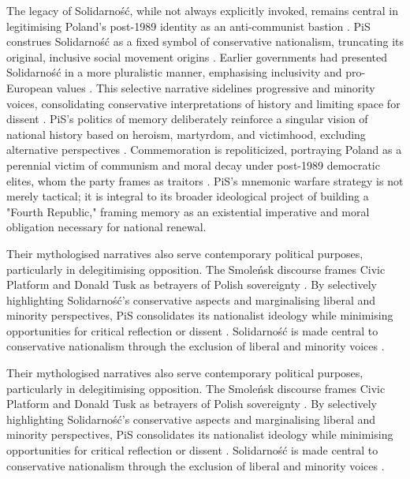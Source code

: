 The legacy of Solidarność, while not always explicitly invoked, remains central in legitimising Poland’s post-1989 identity as an anti-communist bastion \citep{piotrowski_between_2010}. PiS construes Solidarność as a fixed symbol of conservative nationalism, truncating its original, inclusive social movement origins \citep{piotrowski_between_2010}. Earlier governments had presented Solidarność in a more pluralistic manner, emphasising inclusivity and pro-European values \citep{woycicka_mnemonic_2024}. This selective narrative sidelines progressive and minority voices, consolidating conservative interpretations of history and limiting space for dissent \citep{assmann_transnational_2014}. PiS’s politics of memory deliberately reinforce a singular vision of national history based on heroism, martyrdom, and victimhood, excluding alternative perspectives \citep{mazzini_three-dimensional_2018}. Commemoration is repoliticized, portraying Poland as a perennial victim of communism and moral decay under post-1989 democratic elites, whom the party frames as traitors \citep{lazor_memory_2016}. PiS’s mnemonic warfare strategy is not merely tactical; it is integral to its broader ideological project of building a "Fourth Republic," framing memory as an existential imperative and moral obligation necessary for national renewal.

Their mythologised narratives also serve contemporary political purposes, particularly in delegitimising opposition. The Smoleńsk discourse frames Civic Platform and Donald Tusk as betrayers of Polish sovereignty \citep{ksiazek_smolensk_2018}. By selectively highlighting Solidarność’s conservative aspects and marginalising liberal and minority perspectives, PiS consolidates its nationalist ideology while minimising opportunities for critical reflection or dissent \citep{piotrowski_between_2010}. Solidarność is made central to conservative nationalism through the exclusion of liberal and minority voices \citep{lazor_memory_2016}.

Their mythologised narratives also serve contemporary political purposes, particularly in delegitimising opposition. The Smoleńsk discourse frames Civic Platform and Donald Tusk as betrayers of Polish sovereignty \citep{ksiazek_smolensk_2018}. By selectively highlighting Solidarność’s conservative aspects and marginalising liberal and minority perspectives, PiS consolidates its nationalist ideology while minimising opportunities for critical reflection or dissent \citep{piotrowski_between_2010}. Solidarność is made central to conservative nationalism through the exclusion of liberal and minority voices \citep{lazor_memory_2016}.

